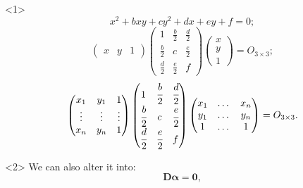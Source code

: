 \documentclass{beamer}
\begin{document}
\begin{frame}
\begin{columns}
            \begin{column}{0.6\linewidth}
                \begin{onlyenv}<1>
                    $$x^2 + bxy +cy^2+dx+ey+f=0;$$
                    $$\begin{pmatrix}
                        x & y & 1
                    \end{pmatrix}
                    \begin{pmatrix}
                        1 & \frac{b}{2} & \frac{d}{2} \\
                        \frac{b}{2} & c & \frac{e}{2} \\
                        \frac{d}{2} & \frac{e}{2} & f
                    \end{pmatrix}
                    \begin{pmatrix}
                        x\\y\\1
                    \end{pmatrix} = O_{3\times3};$$
                    \begin{align*}
                        \begin{pmatrix}
                            x_1 & y_1 & 1 \\
                            \vdots & \vdots & \vdots \\
                            x_n & y_n & 1
                        \end{pmatrix}
                        \begin{pmatrix}
                            1 & \cfrac{b}{2} & \cfrac{d}{2} \\
                            \cfrac{b}{2} & c & \cfrac{e}{2} \\
                            \cfrac{d}{2} & \cfrac{e}{2} & f
                        \end{pmatrix}
                        \begin{pmatrix}
                            x_1 & \dots & x_n\\y_1 & \dots & y_n\\1 & \dots &1
                        \end{pmatrix} = O_{3\times3}.
                    \end{align*}
                \end{onlyenv}
                \begin{onlyenv}<2>
                    We can also alter it into:
                    \[\mathbf{D} \mathbf{\alpha} = \mathbf{0},\]

\end{onlyenv}
\end{column}
\end{columns}
\end{frame}
\end{document}
